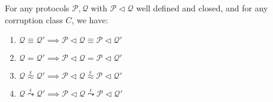 \begin{theorem}
  For any protocols $\mathcal{P}, \mathcal{Q}$ with $\mathcal{P} \lhd \mathcal{Q}$
  well defined and closed, and for any corruption class $C$, we have:
  \begin{enumerate}
    \item $\mathcal{Q} \equiv \mathcal{Q}' \implies \mathcal{P} \lhd \mathcal{Q} \equiv \mathcal{P} \lhd \mathcal{Q}'$
    \item $\mathcal{Q} = \mathcal{Q}' \implies \mathcal{P} \lhd \mathcal{Q} = \mathcal{P} \lhd \mathcal{Q}'$
    \item $\mathcal{Q} \overset{\epsilon}{\approx} \mathcal{Q}' \implies \mathcal{P} \lhd \mathcal{Q} \overset{\epsilon}{\approx} \mathcal{P} \lhd \mathcal{Q}'$
    \item $\mathcal{Q} \overset{\epsilon}{\leadsto} \mathcal{Q}' \implies \mathcal{P} \lhd \mathcal{Q} \overset{\epsilon}{\leadsto} \mathcal{P} \lhd \mathcal{Q}'$
  \end{enumerate}

   
\end{theorem}
